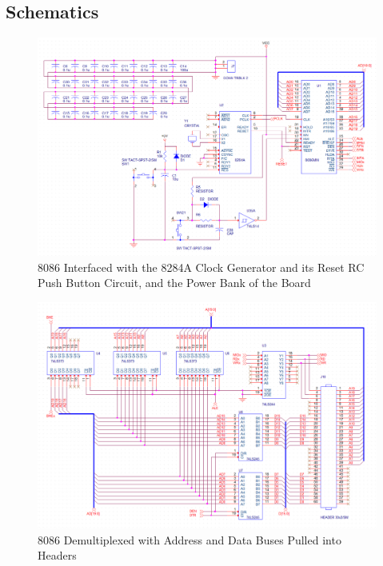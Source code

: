 \newpage

\begin{appendices} 

    \section{Schematics} \label{appendix:schematics}

        \begin{figure}[ht]
            \begin{center}
                \includegraphics[width=1\textwidth]{figures/schematics/8086.png}
                \caption{8086 Interfaced with the 8284A Clock Generator and its Reset RC Push Button Circuit, and the Power Bank of the Board} \label{fig:page1}
            \end{center}
        \end{figure}

        \begin{figure}[ht]
            \begin{center}
                \includegraphics[width=1\textwidth]{figures/schematics/buffers.png}
                \caption{8086 Demultiplexed with Address and Data Buses Pulled into Headers} \label{fig:page2}
            \end{center}
        \end{figure}


\end{appendices}
